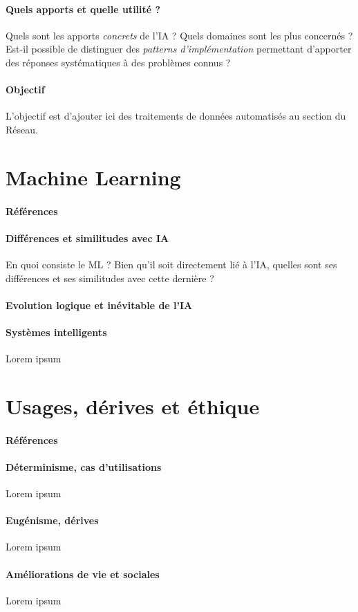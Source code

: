 \paragraph{Quels apports et quelle utilité ?} Quels sont les apports \emph{concrets}
de l'IA ? Quels domaines sont les plus concernés ? Est-il possible de distinguer
des \emph{patterns d'implémentation} permettant d'apporter des réponses systématiques
à des problèmes connus ?

\paragraph{Objectif} L'objectif est d'ajouter ici des traitements de données automatisés au section
du Réseau.

\section{Machine Learning}
\paragraph{Références} \cite{AlphaGo:0} \cite{AlphaGo:1}

\paragraph{Différences et similitudes avec IA} En quoi consiste le ML ? Bien qu'il soit
directement lié à l'IA, quelles sont ses différences et ses similitudes avec cette dernière ?

\paragraph{Evolution logique et inévitable de l'IA} 

\paragraph{Systèmes intelligents} Lorem ipsum


\section{Usages, dérives et éthique}
\paragraph{Références} \cite{Asimov:0} \cite{Damasio:0}

\paragraph{Déterminisme, cas d'utilisations} Lorem ipsum

\paragraph{Eugénisme, dérives} Lorem ipsum

\paragraph{Améliorations de vie et sociales} Lorem ipsum